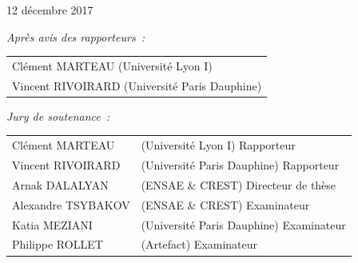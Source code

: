 \documentclass[a4paper,12pt]{book}
\begin{document}
{\vspace{10mm}

 12 décembre 2017

\vspace{5mm}

\noindent
{\small \it Apr\`es avis des rapporteurs~: }
\begin{tabular}{l} {\sc Clément MARTEAU} (Université Lyon I)\vspace{1mm}  \\
{\sc  Vincent RIVOIRARD} (Université Paris Dauphine)\\
\end{tabular}

\vspace{8mm}

\noindent
{\small \it Jury de soutenance~: }
\begin{tabular}{ll}
{\sc   Clément MARTEAU}&(Université Lyon I) {\small Rapporteur}\vspace{1mm}\\
{\sc   Vincent RIVOIRARD}&(Université Paris Dauphine) {\small Rapporteur}\vspace{1mm}\\
{\sc   Arnak DALALYAN}&(ENSAE \& CREST) {\small Directeur de th\`ese}\vspace{1mm}\\
{\sc   Alexandre TSYBAKOV}&(ENSAE \& CREST) {\small Examinateur}\vspace{1mm}\\
{\sc   Katia MEZIANI}&(Université Paris Dauphine) {\small Examinateur}\vspace{1mm}\\
{\sc   Philippe ROLLET}&(Artefact) {\small Examinateur}\vspace{1mm}\\
\end{tabular}

}
\end{document}
